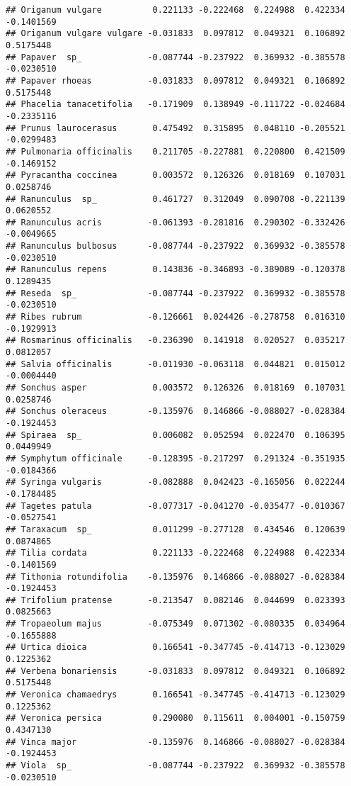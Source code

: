 \documentclass[
]{article}
\begin{document}
\begin{verbatim}
## Origanum vulgare          0.221133 -0.222468  0.224988  0.422334 -0.1401569
## Origanum vulgare vulgare -0.031833  0.097812  0.049321  0.106892  0.5175448
## Papaver  sp_             -0.087744 -0.237922  0.369932 -0.385578 -0.0230510
## Papaver rhoeas           -0.031833  0.097812  0.049321  0.106892  0.5175448
## Phacelia tanacetifolia   -0.171909  0.138949 -0.111722 -0.024684 -0.2335116
## Prunus laurocerasus       0.475492  0.315895  0.048110 -0.205521 -0.0299483
## Pulmonaria officinalis    0.211705 -0.227881  0.220800  0.421509 -0.1469152
## Pyracantha coccinea       0.003572  0.126326  0.018169  0.107031  0.0258746
## Ranunculus  sp_           0.461727  0.312049  0.090708 -0.221139  0.0620552
## Ranunculus acris         -0.061393 -0.281816  0.290302 -0.332426 -0.0049665
## Ranunculus bulbosus      -0.087744 -0.237922  0.369932 -0.385578 -0.0230510
## Ranunculus repens         0.143836 -0.346893 -0.389089 -0.120378  0.1289435
## Reseda  sp_              -0.087744 -0.237922  0.369932 -0.385578 -0.0230510
## Ribes rubrum             -0.126661  0.024426 -0.278758  0.016310 -0.1929913
## Rosmarinus officinalis   -0.236390  0.141918  0.020527  0.035217  0.0812057
## Salvia officinalis       -0.011930 -0.063118  0.044821  0.015012 -0.0004440
## Sonchus asper             0.003572  0.126326  0.018169  0.107031  0.0258746
## Sonchus oleraceus        -0.135976  0.146866 -0.088027 -0.028384 -0.1924453
## Spiraea  sp_              0.006082  0.052594  0.022470  0.106395  0.0449949
## Symphytum officinale     -0.128395 -0.217297  0.291324 -0.351935 -0.0184366
## Syringa vulgaris         -0.082888  0.042423 -0.165056  0.022244 -0.1784485
## Tagetes patula           -0.077317 -0.041270 -0.035477 -0.010367 -0.0527541
## Taraxacum  sp_            0.011299 -0.277128  0.434546  0.120639  0.0874865
## Tilia cordata             0.221133 -0.222468  0.224988  0.422334 -0.1401569
## Tithonia rotundifolia    -0.135976  0.146866 -0.088027 -0.028384 -0.1924453
## Trifolium pratense       -0.213547  0.082146  0.044699  0.023393  0.0825663
## Tropaeolum majus         -0.075349  0.071302 -0.080335  0.034964 -0.1655888
## Urtica dioica             0.166541 -0.347745 -0.414713 -0.123029  0.1225362
## Verbena bonariensis      -0.031833  0.097812  0.049321  0.106892  0.5175448
## Veronica chamaedrys       0.166541 -0.347745 -0.414713 -0.123029  0.1225362
## Veronica persica          0.290080  0.115611  0.004001 -0.150759  0.4347130
## Vinca major              -0.135976  0.146866 -0.088027 -0.028384 -0.1924453
## Viola  sp_               -0.087744 -0.237922  0.369932 -0.385578 -0.0230510

\end{verbatim}
\end{document}
